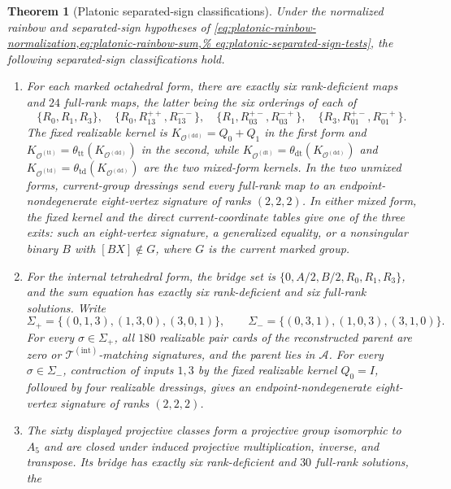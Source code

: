 \documentclass[11pt,letterpaper,onecolumn]{article}
\theoremstyle{plain}
\newtheorem{theorem}{Theorem}[section]
\theoremstyle{definition}
\theoremstyle{remark}
\newcommand{\cA}{\mathscr A}
\newcommand{\TetInt}{{\mathcal T^{(\mathrm{int})}}}
\newcommand{\OctDD}{{\mathcal O^{(\mathrm{dd})}}}
\newcommand{\OctTT}{{\mathcal O^{(\mathrm{tt})}}}
\newcommand{\OctDT}{{\mathcal O^{(\mathrm{dt})}}}
\newcommand{\OctTD}{{\mathcal O^{(\mathrm{td})}}}
\begin{document}
\begin{theorem}[Platonic separated-sign classifications]
\label{thm:cert-interface-platonic-bridges}
Under the normalized rainbow and separated-sign hypotheses of
\cref{eq:platonic-rainbow-normalization,eq:platonic-rainbow-sum,%
eq:platonic-separated-sign-tests}, the following separated-sign classifications
hold.
\begin{enumerate}[label=\textnormal{(\roman*)}]
\item For each marked octahedral form, there are exactly six rank-deficient maps
      and \(24\) full-rank maps, the latter being the six orderings of each
      of
      \[
      \{R_0,R_1,R_3\},\quad
      \{R_0,R_{13}^{++},R_{13}^{--}\},\quad
      \{R_1,R_{03}^{+-},R_{03}^{-+}\},\quad
      \{R_3,R_{01}^{+-},R_{01}^{-+}\}.
      \]
      The fixed realizable kernel is
      \(K_{\OctDD}=Q_0+Q_1\) in the first form and
      \(K_{\OctTT}=\theta_{\mathrm{tt}}(K_{\OctDD})\) in the
      second, while
      \(K_{\OctDT}=\theta_{\mathrm{dt}}(K_{\OctDD})\) and
      \(K_{\OctTD}=\theta_{\mathrm{td}}(K_{\OctDD})\) are the two
      mixed-form kernels.  In the two unmixed forms, current-group
      dressings send every full-rank map to an endpoint-nondegenerate
      eight-vertex signature of ranks \((2,2,2)\).  In either mixed form,
      the fixed kernel and the direct current-coordinate tables give one of
      the three exits: such an eight-vertex signature, a generalized equality, or a nonsingular binary \(B\) with \([BX]\notin G\), where \(G\) is the current marked group.
\item For the internal tetrahedral form, the bridge set is
      \(\{0,A/2,B/2,R_0,R_1,R_3\}\), and the sum equation has exactly six
      rank-deficient and six full-rank solutions.  Write
      \[
      \Sigma_+=\{(0,1,3),(1,3,0),(3,0,1)\},\qquad
      \Sigma_-=\{(0,3,1),(1,0,3),(3,1,0)\}.
      \]
      For every
      \(\sigma\in\Sigma_+\), all \(180\) realizable pair cards of the reconstructed
      parent are zero or \(\TetInt\)-matching signatures, and the parent lies in \(\cA\).  For every
      \(\sigma\in\Sigma_-\), contraction of inputs \(1,3\) by the fixed
      realizable kernel \(Q_0=I\), followed by four realizable dressings, gives an
      endpoint-nondegenerate eight-vertex signature of ranks \((2,2,2)\).
\item The sixty displayed projective classes form a projective group
      isomorphic to \(A_5\) and are closed under induced projective
      multiplication, inverse, and transpose.  Its
      bridge has exactly six rank-deficient and \(30\) full-rank solutions, the

\end{enumerate}
\end{theorem}
\end{document}
